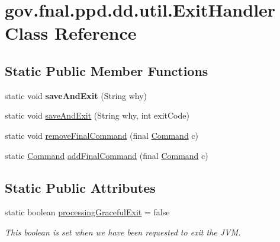 \hypertarget{classgov_1_1fnal_1_1ppd_1_1dd_1_1util_1_1ExitHandler}{\section{gov.\-fnal.\-ppd.\-dd.\-util.\-Exit\-Handler Class Reference}
\label{classgov_1_1fnal_1_1ppd_1_1dd_1_1util_1_1ExitHandler}
}
\subsection*{Static Public Member Functions}
\begin{DoxyCompactItemize}
\item 
\hypertarget{classgov_1_1fnal_1_1ppd_1_1dd_1_1util_1_1ExitHandler_a32afc81cf237c5607fb04fa9955546c7}{static void {\bfseries save\-And\-Exit} (String why)}\label{classgov_1_1fnal_1_1ppd_1_1dd_1_1util_1_1ExitHandler_a32afc81cf237c5607fb04fa9955546c7}

\item 
static void \hyperlink{classgov_1_1fnal_1_1ppd_1_1dd_1_1util_1_1ExitHandler_abbeb177f6c6c149937057edf35da6d94}{save\-And\-Exit} (String why, int exit\-Code)
\item 
static void \hyperlink{classgov_1_1fnal_1_1ppd_1_1dd_1_1util_1_1ExitHandler_a76ec6ac2d9ae8b8129d1874ea9c1ee7a}{remove\-Final\-Command} (final \hyperlink{interfacegov_1_1fnal_1_1ppd_1_1dd_1_1util_1_1Command}{Command} c)
\item 
static \hyperlink{interfacegov_1_1fnal_1_1ppd_1_1dd_1_1util_1_1Command}{Command} \hyperlink{classgov_1_1fnal_1_1ppd_1_1dd_1_1util_1_1ExitHandler_ab1121c81909800f4ef6fb5de3448f9d9}{add\-Final\-Command} (final \hyperlink{interfacegov_1_1fnal_1_1ppd_1_1dd_1_1util_1_1Command}{Command} c)
\end{DoxyCompactItemize}
\subsection*{Static Public Attributes}
\begin{DoxyCompactItemize}
\item 
\hypertarget{classgov_1_1fnal_1_1ppd_1_1dd_1_1util_1_1ExitHandler_af5fcde17179f855b66e49420fa8cac7d}{static boolean \hyperlink{classgov_1_1fnal_1_1ppd_1_1dd_1_1util_1_1ExitHandler_af5fcde17179f855b66e49420fa8cac7d}{processing\-Graceful\-Exit} = false}\label{classgov_1_1fnal_1_1ppd_1_1dd_1_1util_1_1ExitHandler_af5fcde17179f855b66e49420fa8cac7d}

\begin{DoxyCompactList}\small\item\em This boolean is set when we have been requested to exit the J\-V\-M. \end{DoxyCompactList}\end{DoxyCompactItemize}



